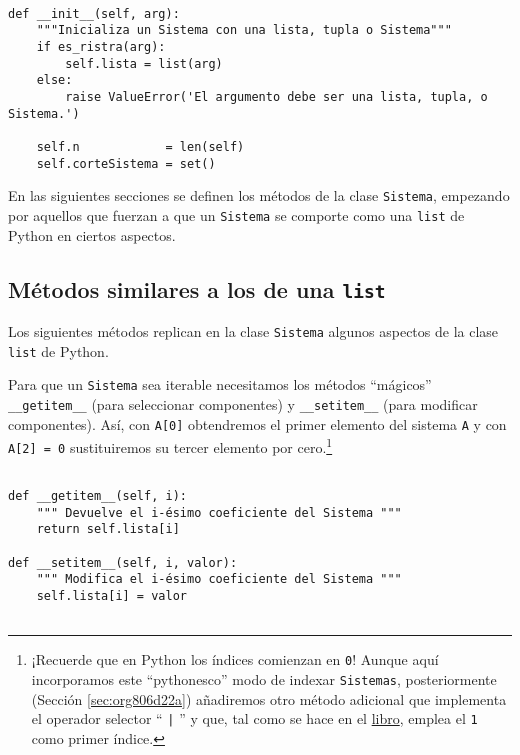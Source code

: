 \documentclass[11pt]{report}
\begin{document}
\begin{verbatim}

def __init__(self, arg):
    """Inicializa un Sistema con una lista, tupla o Sistema"""                        
    if es_ristra(arg):
        self.lista = list(arg)
    else:
        raise ValueError('El argumento debe ser una lista, tupla, o Sistema.')

    self.n            = len(self)
    self.corteSistema = set()

\end{verbatim}

En las siguientes secciones se definen los métodos de la clase
\texttt{Sistema}, empezando por aquellos que fuerzan a que un \texttt{Sistema} se
comporte como una \texttt{list} de Python en ciertos aspectos.

\medskip

\subsection{Métodos similares a los de una \texttt{list}}
\label{sec:orgc4262f8}
       Los siguientes métodos replican en la clase \texttt{Sistema} algunos aspectos
de la clase \texttt{list} de Python.

Para que un \texttt{Sistema} sea iterable necesitamos los métodos
``mágicos'' \texttt{\_\_getitem\_\_} (para seleccionar componentes) y
\texttt{\_\_setitem\_\_} (para modificar componentes).  Así, con \texttt{A[0]}
obtendremos el primer elemento del sistema \texttt{A} y con \texttt{A[2] = 0}
sustituiremos su tercer elemento por cero.\footnote{¡Recuerde que en
Python los índices comienzan en \texttt{0}!  Aunque aquí incorporamos este
``pythonesco'' modo de indexar \texttt{Sistemas}, posteriormente (Sección
\ref{sec:org806d22a}) añadiremos otro método adicional que implementa el operador
selector `` \texttt{|} '' y que, tal como se hace en el \href{https://mbujosab.github.io/CursoDeAlgebraLineal/libro.pdf\#chapter.1}{libro}, emplea el \texttt{1}
como primer índice.}

\begin{verbatim}

def __getitem__(self, i):
    """ Devuelve el i-ésimo coeficiente del Sistema """
    return self.lista[i]

def __setitem__(self, i, valor):
    """ Modifica el i-ésimo coeficiente del Sistema """
    self.lista[i] = valor
        
\end{verbatim}
\end{document}
